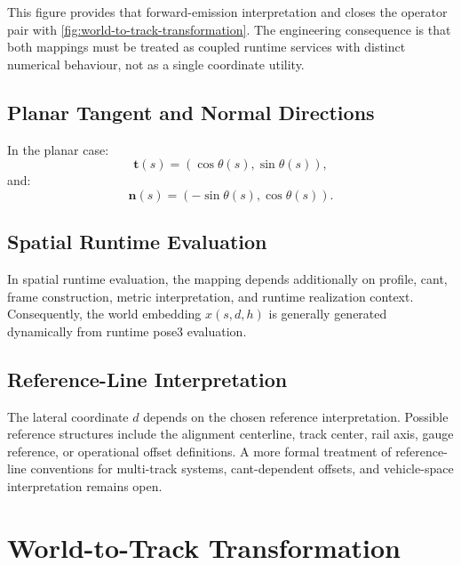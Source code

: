 This figure provides that forward-emission interpretation and closes the
operator pair with \cref{fig:world-to-track-transformation}. The
engineering consequence is that both mappings must be treated as coupled
runtime services with distinct numerical behaviour, not as a single
coordinate utility.


\subsection{Planar Tangent and Normal Directions}

In the planar case:
\[
\mathbf t(s)
=
(\cos\theta(s),\sin\theta(s)),
\]
and:
\[
\mathbf n(s)
=
(-\sin\theta(s),\cos\theta(s)).
\]


\subsection{Spatial Runtime Evaluation}

In spatial runtime evaluation, the mapping depends additionally on
profile, cant, frame construction, metric interpretation, and runtime
realization context. Consequently, the world embedding
\(x(s,d,h)\) is generally generated dynamically from runtime pose3
evaluation.


\subsection{Reference-Line Interpretation}

The lateral coordinate \(d\) depends on the chosen reference
interpretation. Possible reference structures include the alignment
centerline, track center, rail axis, gauge reference, or operational
offset definitions. A more formal treatment of reference-line conventions
for multi-track systems, cant-dependent offsets, and vehicle-space
interpretation remains open.

\section{World-to-Track Transformation}

